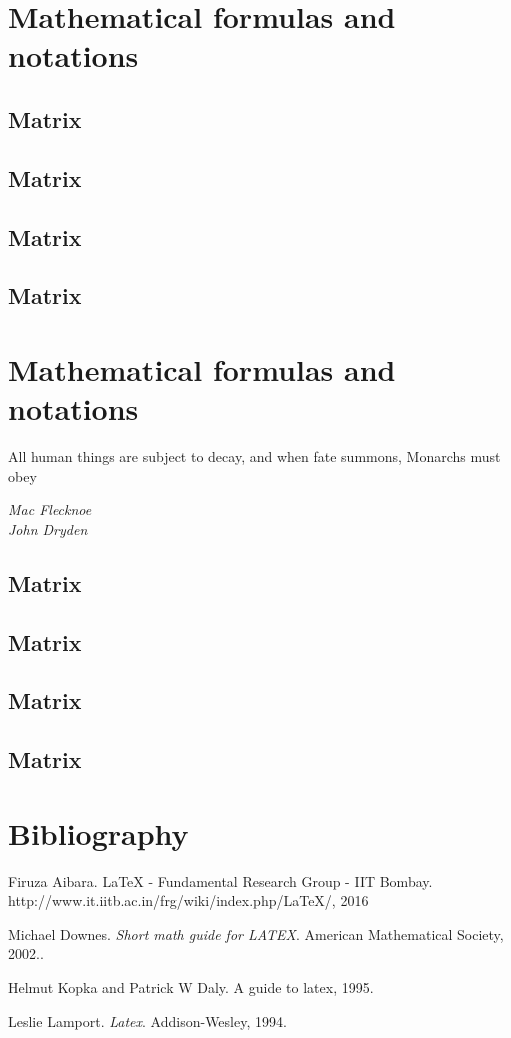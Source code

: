 \documentclass{article}
\begin{document}
\section{Mathematical formulas and notations}
\subsection{Matrix}
\subsection{Matrix}
\subsection{Matrix}
\subsection{Matrix}

\section{Mathematical formulas and notations}

\epigraph{All human things are subject to decay, and when fate 
summons, Monarchs must obey}{\textit{Mac Flecknoe \\ John Dryden}}
 
\subsection{Matrix}
\subsection{Matrix}
\subsection{Matrix}
\subsection{Matrix}

\section{Bibliography}
\begin{thebibliography}{9}
Firuza Aibara. LaTeX - Fundamental Research Group - IIT Bombay.
http://www.it.iitb.ac.in/frg/wiki/index.php/LaTeX/, 2016
 
Michael Downes. \textit{Short math guide for LATEX}. American Mathematical
Society, 2002..
 
 Helmut Kopka and Patrick W Daly. A guide to latex, 1995.
 
Leslie Lamport. \textit{Latex}. Addison-Wesley, 1994.
\end{thebibliography}
\end{document}
